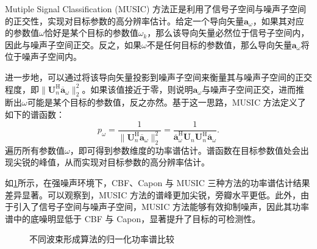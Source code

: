 Mutiple Signal Classification (MUSIC) 方法正是利用了信号子空间与噪声子空间的正交性，实现对目标参数的高分辨率估计。给定一个导向矢量\( \bm{a}_{\omega} \)，如果其对应的参数值\( \omega \)恰好是某个目标的参数值\( \omega_k \)，那么该导向矢量必然位于信号子空间内，因此与噪声子空间正交。反之，如果\( \omega \)不是任何目标的参数值，那么导向矢量\( \bm{a}_{\omega} \)将位于噪声子空间内。

进一步地，可以通过将该导向矢量投影到噪声子空间来衡量其与噪声子空间的正交程度，即\( \|\mathbf{U}_{n}^{\mathrm{H}} \overline{\bm{a}}_{\omega}\|_2^2\)。如果该值接近于零，则说明\( \bm{a}_{\omega} \)与噪声子空间正交，进而推断出\( \omega \)可能是某个目标的参数值，反之亦然。基于这一思路，MUSIC 方法定义了如下的谱函数：
\[
    p_{\omega} = \frac{1}{\|\mathbf{U}_{n}^{\mathrm{H}} \overline{\bm{a}}_{\omega}\|_2^2} = \frac{1}{\overline{\bm{a}}_{\omega}^{\mathrm{H}} \mathbf{U}_{n} \mathbf{U}_{n}^{\mathrm{H}} \overline{\bm{a}}_{\omega}}.
\]
遍历所有参数值\( \omega \)，即可得到参数维度的功率谱估计。谱函数在目标参数值处会出现尖锐的峰值，从而实现对目标参数的高分辨率估计。

如\cref{fig_music_eg}所示，在强噪声环境下，CBF、Capon 与 MUSIC 三种方法的功率谱估计结果差异显著。可以观察到，MUSIC 方法的谱峰更加尖锐，旁瓣水平更低。此外，由于引入了信号子空间与噪声子空间，MUSIC 方法能够有效抑制噪声，因此其功率谱中的底噪明显低于 CBF 与 Capon，显著提升了目标的可检测性。
\begin{figure}[htb!]
    \centering
    \caption{不同波束形成算法的归一化功率谱比较}
    \label{fig_music_eg}
\end{figure}

